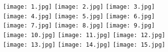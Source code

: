 \documentclass[a4paper, 10pt]{extarticle}
\begin{document}
\texttt{[image: 1.jpg]}
\texttt{[image: 2.jpg]}
\texttt{[image: 3.jpg]}
\\
\texttt{[image: 4.jpg]}
\texttt{[image: 5.jpg]}
\texttt{[image: 6.jpg]}
\\
\texttt{[image: 7.jpg]}
\texttt{[image: 8.jpg]}
\texttt{[image: 9.jpg]}
\\
\texttt{[image: 10.jpg]}
\texttt{[image: 11.jpg]}
\texttt{[image: 12.jpg]}
\\
\texttt{[image: 13.jpg]}
\texttt{[image: 14.jpg]}
\texttt{[image: 15.jpg]}
\end{document}

